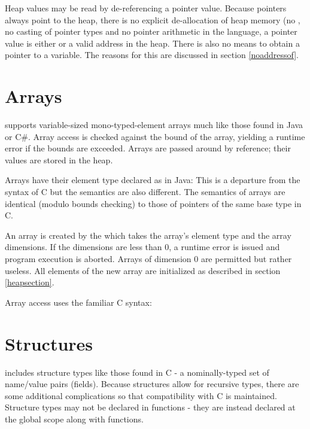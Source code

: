 Heap values may be read by de-referencing a pointer value. Because pointers
always point to the heap, there is no explicit de-allocation of heap memory (no
, no casting of pointer types and no pointer arithmetic in the
language, a pointer value is either  or a valid address in the
heap. There is also no means to obtain a pointer to a variable. The reasons for
this are discussed in section \ref{noaddressof}.

\grammarbegin
{}
\proddef{\lit{*}}

\grmlhsptr
\grammarend


\section{Arrays}

\langname{} supports variable-sized mono-typed-element arrays much like those
found in Java or C\#. Array access is checked against the bound of the array,
yielding a runtime error if the bounds are exceeded. Arrays are passed around by
reference; their values are stored in the heap.

Arrays have their element type declared as in Java:  This is
a departure from the syntax of C but the semantics are also different. The
semantics of \langname{} arrays are identical (modulo bounds checking) to those
of pointers of the same base type in C.

An array is created by the  which takes the array's
element type and the array dimensions. If the dimensions are less than 0, a
runtime error is issued and program execution is aborted. Arrays of dimension 0
are permitted but rather useless. All elements of the new array are initialized
as described in section \ref{heapsection}.

Array access uses the familiar C syntax:

\grammarbegin
{}
\grmexprarray

\grmaearr
\grammarend


\section{Structures}

\langname{} includes structure types like those found in C - a nominally-typed
set of name/value pairs (fields). Because structures allow for recursive types,
there are some additional complications so that compatibility with C is
maintained. Structure types may not be declared in functions - they are instead
declared at the global scope along with functions.

